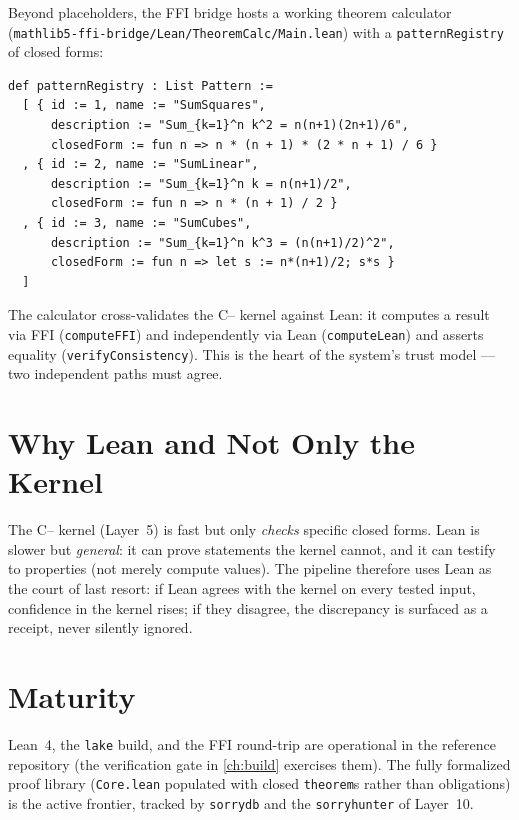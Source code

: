 Beyond placeholders, the FFI bridge hosts a working theorem calculator
(\texttt{mathlib5-ffi-bridge/Lean/TheoremCalc/Main.lean}) with a
\texttt{patternRegistry} of closed forms:
\begin{lstlisting}[language=Lean4,caption={Pattern registry (TheoremCalc/Main.lean).},label=lst:lean-reg]
def patternRegistry : List Pattern :=
  [ { id := 1, name := "SumSquares",
      description := "Sum_{k=1}^n k^2 = n(n+1)(2n+1)/6",
      closedForm := fun n => n * (n + 1) * (2 * n + 1) / 6 }
  , { id := 2, name := "SumLinear",
      description := "Sum_{k=1}^n k = n(n+1)/2",
      closedForm := fun n => n * (n + 1) / 2 }
  , { id := 3, name := "SumCubes",
      description := "Sum_{k=1}^n k^3 = (n(n+1)/2)^2",
      closedForm := fun n => let s := n*(n+1)/2; s*s }
  ]
\end{lstlisting}
The calculator cross-validates the C{--} kernel against Lean: it computes a
result via FFI (\texttt{computeFFI}) and independently via Lean
(\texttt{computeLean}) and asserts equality (\texttt{verifyConsistency}). This
is the heart of the system's trust model --- two independent paths must agree.

\section{Why Lean and Not Only the Kernel}
\label{sec:lean-why}

The C{--} kernel (Layer~5) is fast but only \emph{checks} specific closed
forms. Lean is slower but \emph{general}: it can prove statements the kernel
cannot, and it can testify to properties (not merely compute values). The
pipeline therefore uses Lean as the court of last resort: if Lean agrees with
the kernel on every tested input, confidence in the kernel rises; if they
disagree, the discrepancy is surfaced as a receipt, never silently ignored.

\section{Maturity}
\label{sec:lean-limits}

Lean~4, the \texttt{lake} build, and the FFI round-trip are operational in the
reference repository (the verification gate in \cref{ch:build} exercises
them). The fully formalized proof library (\texttt{Core.lean} populated with
closed \texttt{theorem}s rather than obligations) is the active frontier,
tracked by \texttt{sorrydb} and the \texttt{sorryhunter} of Layer~10.
